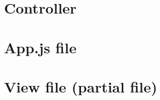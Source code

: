 \section{Controller}\label{app:controller}


\section{App.js file}\label{app:app.js}


\section{View file (partial file)}\label{app:view}

